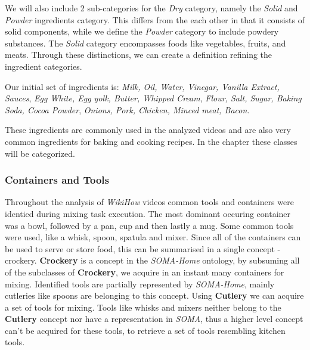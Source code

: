 We will also include 2 sub-categories for the \textit{Dry} category, namely the \textit{Solid} and \textit{Powder} ingredients category. 
This differs from the each other in that it consists of solid components, while we define the \textit{Powder} category to include powdery substances. The \textit{Solid} category encompasses foods like vegetables, fruits, and meats. 
Through these distinctions, we can create a definition refining the ingredient categories.

Our initial set of ingredients is: \textit{Milk, Oil, Water, Vinegar, Vanilla Extract, Sauces}, \textit{Egg White, Egg yolk, Butter, Whipped Cream}, \textit{Flour, Salt, Sugar, Baking Soda, Cocoa Powder},
\textit{Onions, Pork, Chicken, Minced meat, Bacon}.

These ingredients are commonly used in the analyzed videos and are also very common ingredients for baking and cooking recipes.
In the chapter  these classes will be categorized.

\subsubsection{Containers and Tools}
\label{sec:ContainersAndToolsAcquisition}
Throughout the analysis of \textit{WikiHow} videos common tools and containers were identied during mixing task execution.
The most dominant occuring container was a bowl, followed by a pan, cup and then lastly a mug. Some common tools were used, like a whisk, spoon, spatula and mixer.
Since all of the containers can be used to serve or store food, this can be summarised in a single concept - crockery. \textbf{Crockery} is a concept in the \textit{SOMA-Home} \cite{soma}
ontology, by subsuming all of the subclasses of \textbf{Crockery}, we acquire in an instant many containers for mixing. Identified tools are partially represented by \textit{SOMA-Home},
mainly cutleries like spoons are belonging to this concept. Using \textbf{Cutlery} we can acquire a set of tools for mixing. Tools like whisks and mixers neither belong 
to the \textbf{Cutlery} concept nor have a representation in \textit{SOMA}, thus a higher level concept can't be acquired for these tools, to retrieve a set of tools resembling
kitchen tools.   


